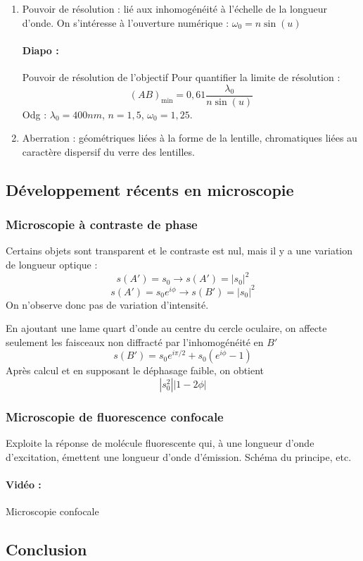 \begin{enumerate}
\item Pouvoir de résolution : lié aux inhomogénéité à l'échelle de la longueur d'onde. On s'intéresse à l'ouverture numérique : $\omega_0 = n\sin(u)$
\paragraph{Diapo : } Pouvoir de résolution de l'objectif
Pour quantifier la limite de résolution :
\begin{equation}
(AB)_\mathrm{min} = 0,61\frac{\lambda_0}{n\sin(u)}
\end{equation}
Odg : $\lambda_0 = \unit{400}{nm}$, $n=1,5$, $\omega_0=1,25$.
\item Aberration : géométriques liées à la forme de la lentille, chromatiques liées au caractère dispersif du verre des lentilles.
\end{enumerate}

\subsection{Développement récents en microscopie}

\subsubsection{Microscopie à contraste de phase}

Certains objets sont transparent et le contraste est nul, mais il y a une variation de longueur optique : 
\begin{equation}
s(A') = s_0 \rightarrow s(A') = |s_0|^2
\end{equation}
\begin{equation}
s(A') = s_0 e^{i\phi} \rightarrow s(B') = |s_0|^2
\end{equation}
On n'observe donc pas de variation d'intensité.

En ajoutant une lame quart d'onde au centre du cercle oculaire, on affecte seulement les faisceaux non diffracté par l'inhomogénéité en $B'$
\begin{equation}
s(B') = s_0e^{i\pi/2} + s_0(e^{i\phi}-1)
\end{equation}
Après calcul et en supposant le déphasage faible, on obtient 
\begin{equation}
|s_0^2||1-2\phi|
\end{equation}

\subsubsection{Microscopie de fluorescence confocale}

Exploite la réponse de molécule fluorescente qui, à une longueur d'onde d'excitation, émettent une longueur d'onde d'émission.
Schéma du principe, etc.

\paragraph{Vidéo :} Microscopie confocale

\subsection{Conclusion}